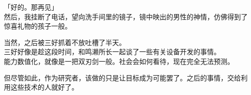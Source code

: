 「好的。那再见」\\

然后，我挂断了电话，望向洗手间里的镜子，镜中映出的男性的神情，仿佛得到了惊喜礼物的孩子一般。

当然，之后被三好抓着不放吐槽了半天。\\

三好好像是趁这段时间，和鸣濑所长一起谈了一些有关设备开发的事情。\\

能力数值化，就像是一把双刃剑一般。社会会如何看待，现在完全无法预测。

但尽管如此，作为研究者，该做的只是让目标成为可能罢了。之后的事情，交给利用这些技术的人就好了。\\

